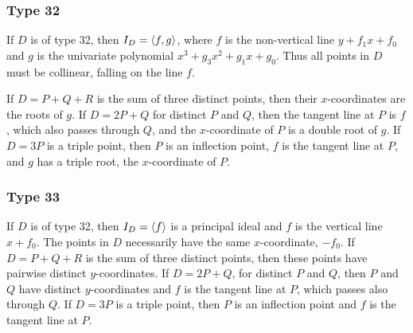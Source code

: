 \subsubsection{Type 32}
  If $D$ is of type 32, then $I_D = \left\langle f, g \right\rangle$, where $f$ is the non-vertical line $y + f_1x + f_0$
  and $g$ is the univariate polynomial $x^3 + g_3x^2 + g_1x + g_0$.
  Thus all points in $D$ must be collinear, falling on the line $f$.
  
  If $D = P + Q + R$ is the sum of three distinct points, then their $x$-coordinates are the roots of $g$.
  If $D = 2P + Q$ for distinct $P$ and $Q$, then the tangent line at $P$ is $f$, which also passes through $Q$,
  and the $x$-coordinate of $P$ is a double root of $g$.
  If $D = 3P$ is a triple point, then $P$ is an inflection point, $f$ is the tangent line at $P$, and $g$ has a triple root,
  the $x$-coordinate of $P$.

\subsubsection{Type 33}
  If $D$ is of type 32, then $I_D = \left\langle f \right\rangle$ is a principal ideal and $f$ is the vertical line $x + f_0$.
  The points in $D$ necessarily have the same $x$-coordinate, $-f_0$.
  If $D = P + Q + R$ is the sum of three distinct points, then these points have pairwise distinct $y$-coordinates.
  If $D = 2P + Q$, for distinct $P$ and $Q$, then $P$ and $Q$ have distinct $y$-coordinates and $f$ is the tangent line at $P$, which passes also through $Q$.
  If $D = 3P$ is a triple point, then $P$ is an inflection point and $f$ is the tangent line at $P$.



